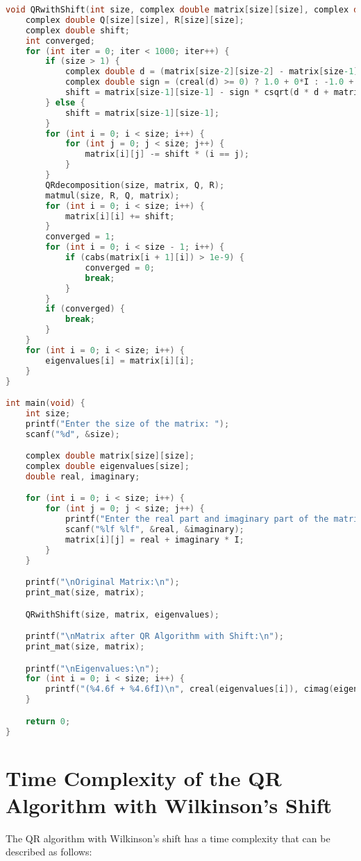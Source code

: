\documentclass[journal]{IEEEtran}
\begin{document}
\begin{lstlisting}[language=C, basicstyle=\ttfamily\footnotesize, keywordstyle=\color{blue}, commentstyle=\color{green!50!black}, stringstyle=\color{orange}]
void QRwithShift(int size, complex double matrix[size][size], complex double eigenvalues[size]) {
    complex double Q[size][size], R[size][size];
    complex double shift;
    int converged;
    for (int iter = 0; iter < 1000; iter++) {
        if (size > 1) {
            complex double d = (matrix[size-2][size-2] - matrix[size-1][size-1]) / 2.0;
            complex double sign = (creal(d) >= 0) ? 1.0 + 0*I : -1.0 + 0*I;
            shift = matrix[size-1][size-1] - sign * csqrt(d * d + matrix[size-1][size-2] * matrix[size-2][size-1]);
        } else {
            shift = matrix[size-1][size-1];
        }
        for (int i = 0; i < size; i++) {
            for (int j = 0; j < size; j++) {
                matrix[i][j] -= shift * (i == j);
            }
        }
        QRdecomposition(size, matrix, Q, R);
        matmul(size, R, Q, matrix);
        for (int i = 0; i < size; i++) {
            matrix[i][i] += shift;
        }
        converged = 1;
        for (int i = 0; i < size - 1; i++) {
            if (cabs(matrix[i + 1][i]) > 1e-9) {
                converged = 0;
                break;
            }
        }
        if (converged) {
            break;
        }
    }
    for (int i = 0; i < size; i++) {
        eigenvalues[i] = matrix[i][i];
    }
}

int main(void) {
    int size;
    printf("Enter the size of the matrix: ");
    scanf("%d", &size);

    complex double matrix[size][size];
    complex double eigenvalues[size];
    double real, imaginary;

    for (int i = 0; i < size; i++) {
        for (int j = 0; j < size; j++) {
            printf("Enter the real part and imaginary part of the matrix[%d][%d]: ", i + 1, j + 1);
            scanf("%lf %lf", &real, &imaginary);
            matrix[i][j] = real + imaginary * I;
        }
    }

    printf("\nOriginal Matrix:\n");
    print_mat(size, matrix);

    QRwithShift(size, matrix, eigenvalues);

    printf("\nMatrix after QR Algorithm with Shift:\n");
    print_mat(size, matrix);

    printf("\nEigenvalues:\n");
    for (int i = 0; i < size; i++) {
        printf("(%4.6f + %4.6fI)\n", creal(eigenvalues[i]), cimag(eigenvalues[i]));
    }

    return 0;
}
\end{lstlisting}
\section{Time Complexity of the QR Algorithm with Wilkinson's Shift} The QR algorithm with Wilkinson's shift has a time complexity that can be described as follows:
\end{document}
